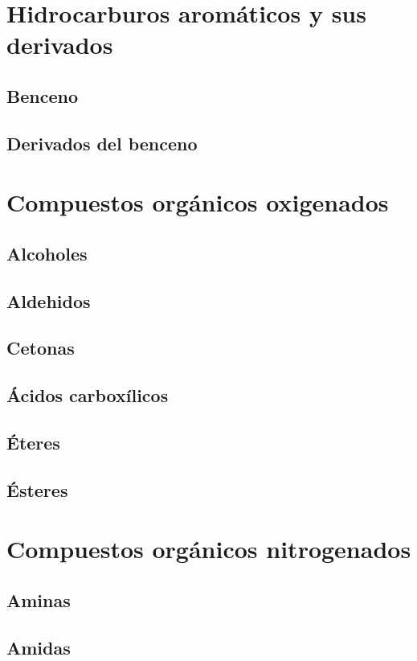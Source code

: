 \documentclass{AsignaturaResumen}
\begin{document}
\part{Hidrocarburos aromáticos y sus derivados}
    \chapter{Benceno}
    \chapter{Derivados del benceno}

\part{Compuestos orgánicos oxigenados}
    \chapter{Alcoholes}
    \chapter{Aldehidos}
    \chapter{Cetonas}
    \chapter{Ácidos carboxílicos}
    \chapter{Éteres}
    \chapter{Ésteres}

\part{Compuestos orgánicos nitrogenados}
    \chapter{Aminas}
    \chapter{Amidas}



    \backmatter



    \appendix
\end{document}

